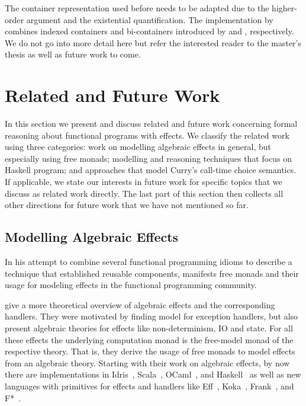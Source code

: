 The container representation used before needs to be adapted due to the higher-order argument and the existential quantification.
The implementation by \citeauthor{bunkenburg2019modeling} combines indexed containers and bi-containers introduced by \citet{altenkirch2015indexed} and \citet{ghani2007higher}, respectively.
We do not go into more detail here but refer the interested reader to the master's thesis as well as future work to come.

\section{Related and Future Work}

In this section we present and discuss related and future work concerning formal reasoning about functional programs with effects.
We classify the related work using three categories: work on modelling algebraic effects in general, but especially using free monads; modelling and reasoning techniques that focus on Haskell program; and approaches that model Curry's call-time choice semantics.
If applicable, we state our interests in future work for specific topics that we discuss as related work directly.
The last part of this section then collects all other directions for future work that we have not mentioned so far.

\subsection{Modelling Algebraic Effects}

In his attempt to combine several functional programming idioms to describe a technique that established reusable components, \citet{swierstra2008data} manifests free monads and their usage for modeling effects in the functional programming community.

\citet{plotkin2009handlers} give a more theoretical overview of algebraic effects and the corresponding handlers.
They were motivated by finding model for exception handlers, but also present algebraic theories for effects like non-determinism, IO and state.
For all these effects the underlying computation monad is the free-model monad of the respective theory.
That is, they derive the usage of free monads to model effects from an algebraic theory.
Starting with their work on algebraic effects, by now there are implementations in Idris~\citep{brady2013programming}, Scala~\citep{brachthauser2017effekt}, OCaml~\citep{kiselyov2018eff}, and Haskell~\citep{kiselyov2015freer,kammar2013handlers} as well as new languages with primitives for effects and handlers like Eff~\citep{pretnar2015introduction}, Koka~\citep{leijen2016algebraic}, Frank~\citep{lindley2017be}, and F*~\citep{swamy2016dependent}.

